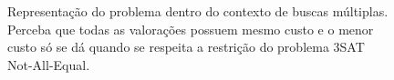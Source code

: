 \begin{figure}
    \caption{Representação do problema dentro do contexto de buscas múltiplas. Perceba que todas as valorações possuem mesmo custo e o menor custo só se dá quando se respeita a restrição do problema 3SAT Not-All-Equal.}
\label{fig:final}
\end{figure}